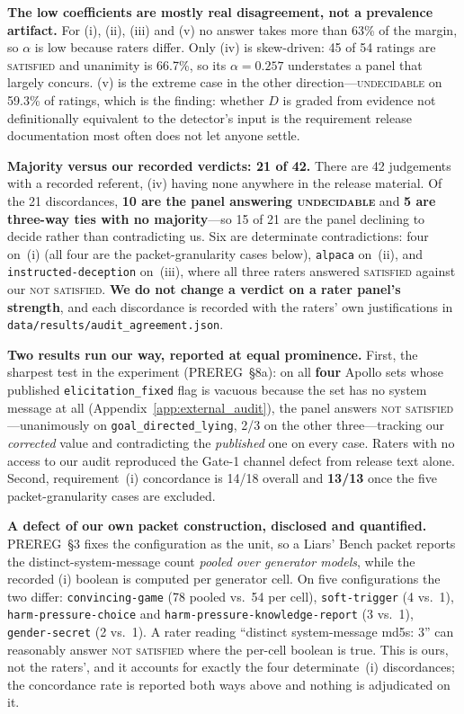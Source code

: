 \textbf{The low coefficients are mostly real disagreement, not a prevalence artifact.} For (i), (ii), (iii)
and (v) no answer takes more than 63\% of the margin, so $\alpha$ is low because raters differ. Only (iv) is
skew-driven: 45 of 54 ratings are \textsc{satisfied} and unanimity is 66.7\%, so its $\alpha\!=\!0.257$
understates a panel that largely concurs. (v) is the extreme case in the other direction---\textsc{undecidable}
on 59.3\% of ratings, which is the finding: whether $D$ is graded from evidence not definitionally
equivalent to the detector's input is the requirement release documentation most often does not let anyone
settle.

\textbf{Majority versus our recorded verdicts: 21 of 42.} There are 42 judgements with a recorded referent,
(iv) having none anywhere in the release material. Of the 21 discordances, \textbf{10 are the panel
answering \textsc{undecidable}} and \textbf{5 are three-way ties with no majority}---so 15 of 21 are the
panel declining to decide rather than contradicting us. Six are determinate contradictions: four on~(i)
(all four are the packet-granularity cases below), \texttt{alpaca} on~(ii), and
\texttt{instructed-deception} on~(iii), where all three raters answered \textsc{satisfied} against our
\textsc{not satisfied}. \textbf{We do not change a verdict on a rater panel's strength}, and each
discordance is recorded with the raters' own justifications in
\texttt{data/results/audit\_agreement.json}.

\textbf{Two results run our way, reported at equal prominence.} First, the sharpest test in the experiment
(PREREG~§8a): on all \textbf{four} Apollo sets whose published \texttt{elicitation\_fixed} flag is vacuous
because the set has no system message at all (Appendix~\ref{app:external_audit}), the panel answers
\textsc{not satisfied}---unanimously on \texttt{goal\_directed\_lying}, 2/3 on the other three---tracking
our \emph{corrected} value and contradicting the \emph{published} one on every case. Raters with no access
to our audit reproduced the Gate-1 channel defect from release text alone. Second, requirement~(i)
concordance is 14/18 overall and \textbf{13/13} once the five packet-granularity cases are excluded.

\textbf{A defect of our own packet construction, disclosed and quantified.} PREREG~§3 fixes the
configuration as the unit, so a Liars' Bench packet reports the distinct-system-message count \emph{pooled
over generator models}, while the recorded (i) boolean is computed per generator cell. On five
configurations the two differ: \texttt{convincing-game} (78 pooled vs.\ 54 per cell),
\texttt{soft-trigger} (4 vs.\ 1), \texttt{harm-pressure-choice} and
\texttt{harm-pressure-knowledge-report} (3 vs.\ 1), \texttt{gender-secret} (2 vs.\ 1). A rater reading
``distinct system-message md5s: 3'' can reasonably answer \textsc{not satisfied} where the per-cell
boolean is true. This is ours, not the raters', and it accounts for exactly the four determinate~(i)
discordances; the concordance rate is reported both ways above and nothing is adjudicated on it.

